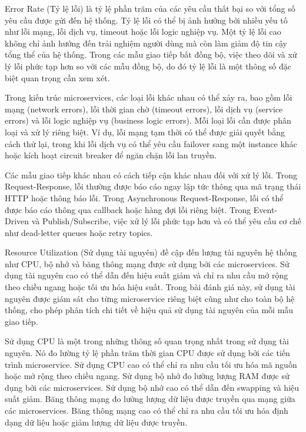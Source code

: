 Error Rate (Tỷ lệ lỗi) là tỷ lệ phần trăm của các yêu cầu thất bại so với tổng số yêu cầu được gửi đến hệ thống. Tỷ lệ lỗi có thể bị ảnh hưởng bởi nhiều yếu tố như lỗi mạng, lỗi dịch vụ, timeout hoặc lỗi logic nghiệp vụ. Một tỷ lệ lỗi cao không chỉ ảnh hưởng đến trải nghiệm người dùng mà còn làm giảm độ tin cậy tổng thể của hệ thống. Trong các mẫu giao tiếp bất đồng bộ, việc theo dõi và xử lý lỗi phức tạp hơn so với các mẫu đồng bộ, do đó tỷ lệ lỗi là một thông số đặc biệt quan trọng cần xem xét.

Trong kiến trúc microservices, các loại lỗi khác nhau có thể xảy ra, bao gồm lỗi mạng (network errors), lỗi thời gian chờ (timeout errors), lỗi dịch vụ (service errors) và lỗi logic nghiệp vụ (business logic errors). Mỗi loại lỗi cần được phân loại và xử lý riêng biệt. Ví dụ, lỗi mạng tạm thời có thể được giải quyết bằng cách thử lại, trong khi lỗi dịch vụ có thể yêu cầu failover sang một instance khác hoặc kích hoạt circuit breaker để ngăn chặn lỗi lan truyền.

Các mẫu giao tiếp khác nhau có cách tiếp cận khác nhau đối với xử lý lỗi. Trong Request-Response, lỗi thường được báo cáo ngay lập tức thông qua mã trạng thái HTTP hoặc thông báo lỗi. Trong Asynchronous Request-Response, lỗi có thể được báo cáo thông qua callback hoặc hàng đợi lỗi riêng biệt. Trong Event-Driven và Publish/Subscribe, việc xử lý lỗi phức tạp hơn và có thể yêu cầu cơ chế như dead-letter queues hoặc retry topics.

Resource Utilization (Sử dụng tài nguyên) đề cập đến lượng tài nguyên hệ thống như CPU, bộ nhớ và băng thông mạng được sử dụng bởi các microservices. Sử dụng tài nguyên cao có thể dẫn đến hiệu suất giảm và chỉ ra nhu cầu mở rộng theo chiều ngang hoặc tối ưu hóa hiệu suất. Trong bài đánh giá này, sử dụng tài nguyên được giám sát cho từng microservice riêng biệt cũng như cho toàn bộ hệ thống, cho phép phân tích chi tiết về hiệu quả sử dụng tài nguyên của mỗi mẫu giao tiếp.

Sử dụng CPU là một trong những thông số quan trọng nhất trong sử dụng tài nguyên. Nó đo lường tỷ lệ phần trăm thời gian CPU được sử dụng bởi các tiến trình microservice. Sử dụng CPU cao có thể chỉ ra nhu cầu tối ưu hóa mã nguồn hoặc mở rộng theo chiều ngang. Sử dụng bộ nhớ đo lường lượng RAM được sử dụng bởi các microservices. Sử dụng bộ nhớ cao có thể dẫn đến swapping và hiệu suất giảm. Băng thông mạng đo lường lượng dữ liệu được truyền qua mạng giữa các microservices. Băng thông mạng cao có thể chỉ ra nhu cầu tối ưu hóa định dạng dữ liệu hoặc giảm lượng dữ liệu được truyền.

